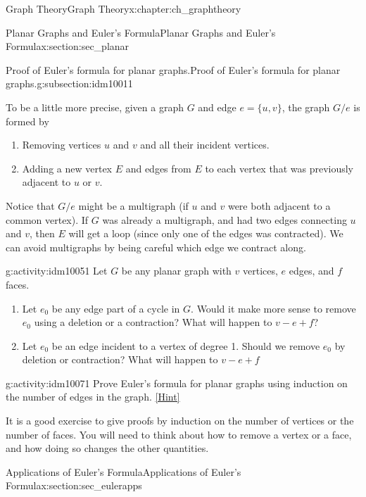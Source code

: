 \documentclass[oneside,10pt,]{book}
\numberwithin{equation}{chapter}
\begin{document}
\begin{chapterptx}{Graph Theory}{}{Graph Theory}{}{}{x:chapter:ch_graphtheory}
\begin{sectionptx}{Planar Graphs and Euler's Formula}{}{Planar Graphs and Euler's Formula}{}{}{x:section:sec_planar}
\begin{subsectionptx}{Proof of Euler's formula for planar graphs.}{}{Proof of Euler's formula for planar graphs.}{}{}{g:subsection:idm10011}
\par
To be a little more precise, given a graph \(G\) and edge \(e = \{u,v\}\), the graph \(G/e\) is formed by%
\begin{enumerate}
\item{}Removing vertices \(u\) and \(v\) and all their incident vertices.%
\item{}Adding a new vertex \(E\) and edges from \(E\) to each vertex that was previously adjacent to \(u\) or \(v\).%
\end{enumerate}
Notice that \(G/e\) might be a multigraph (if \(u\) and \(v\) were both adjacent to a common vertex).  If \(G\) was already a multigraph, and had two edges connecting \(u\) and \(v\), then \(E\) will get a loop (since only one of the edges was contracted).  We can avoid multigraphs by being careful which edge we contract along.%
\begin{activity}{}{g:activity:idm10051}%
Let \(G\) be any planar graph with \(v\) vertices, \(e\) edges, and \(f\) faces.%
\begin{enumerate}[font=\bfseries,label=(\alph*),ref=\alph*]
\item{}Let \(e_0\) be any edge part of a cycle in \(G\).  Would it make more sense to remove \(e_0\) using a deletion or a contraction?  What will happen to \(v - e + f\)?%
\item{}Let \(e_0\) be an edge incident to a vertex of degree 1.  Should we remove \(e_0\) by deletion or contraction?  What will happen to \(v- e + f\)%
\end{enumerate}
\end{activity}
\begin{activity}{}{g:activity:idm10071}%
Prove Euler's formula for planar graphs using induction on the number of edges in the graph.%
\space\hspace*{0pt}\hfill{\tiny\hyperlink{g:hint:idm10074-back}{[Hint]}}\end{activity}
It is a good exercise to give proofs by induction on the number of vertices or the number of faces.  You will need to think about how to remove a vertex or a face, and how doing so changes the other quantities.%
\end{subsectionptx}
\end{sectionptx}
%
%
\typeout{************************************************}
\typeout{************************************************}
%
\begin{sectionptx}{Applications of Euler's Formula}{}{Applications of Euler's Formula}{}{}{x:section:sec_eulerapps}

\end{sectionptx}
\end{chapterptx}
\end{document}
